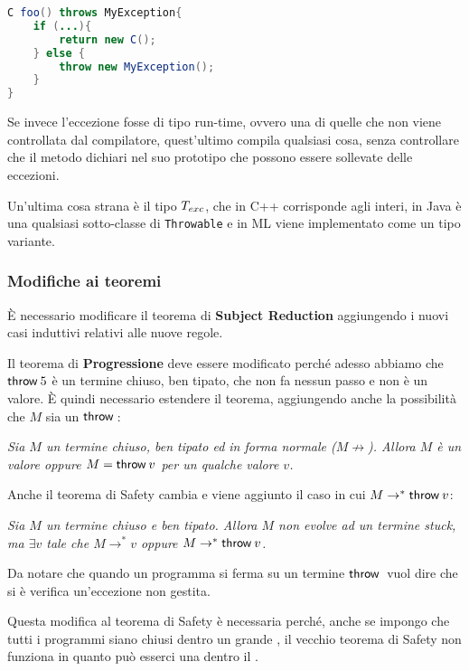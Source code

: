 \begin{lstlisting}[language=Java]
C foo() throws MyException{
	if (...){
		return new C();
	} else {
		throw new MyException();
	}
}
\end{lstlisting}

\noindent Se invece l'eccezione fosse di tipo run-time, ovvero una di quelle che non viene controllata dal compilatore, quest'ultimo compila qualsiasi cosa, senza controllare che il metodo dichiari nel suo prototipo che possono essere sollevate delle eccezioni.

Un'ultima cosa strana è il tipo $T_{exc}$, che in C++ corrisponde agli interi, in Java è una qualsiasi sotto-classe di \texttt{Throwable} e in ML viene implementato come un tipo variante.

\subsubsection{Modifiche ai teoremi}

\`E necessario modificare il teorema di \textbf{Subject Reduction} aggiungendo i nuovi casi induttivi relativi alle nuove regole.

Il teorema di \textbf{Progressione} deve essere modificato perché adesso abbiamo che $\throw{5}$ è un termine chiuso, ben tipato, che non fa nessun passo e non è un valore.
\`E quindi necessario estendere il teorema, aggiungendo anche la possibilità che $M$ sia un $\throw{}$:

\begin{center}
	\textit{Sia $M$ un termine chiuso, ben tipato ed in forma normale ($M \not\to$). Allora $M$ è un valore oppure $M = \throw{v}$ per un qualche valore $v$.}
\end{center}

\noindent Anche il teorema di Safety cambia e viene aggiunto il caso in cui $M\to^* \throw{v}$:

\begin{center}
	\textit{Sia $M$ un termine chiuso e ben tipato. Allora $M$ non evolve ad un termine stuck, ma $\exists v$ tale che $M \to^* v$ oppure $M \to^* \throw{v}$. } 
\end{center}

\noindent Da notare che quando un programma si ferma su un termine $\throw{}$ vuol dire che si è verifica un'eccezione non gestita.

Questa modifica al teorema di Safety è necessaria perché, anche se impongo che tutti i programmi siano chiusi dentro un grande , il vecchio teorema di Safety non funziona in quanto può esserci una  dentro il .









